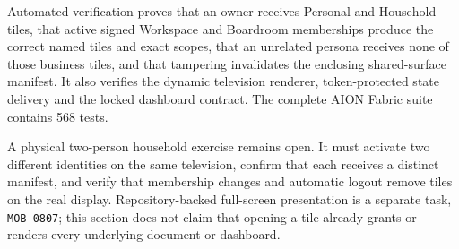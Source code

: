 Automated verification proves that an owner receives Personal and Household tiles,
that active signed Workspace and Boardroom memberships produce the correct named
tiles and exact scopes, that an unrelated persona receives none of those business
tiles, and that tampering invalidates the enclosing shared-surface manifest.  It
also verifies the dynamic television renderer, token-protected state delivery and
the locked dashboard contract.  The complete AION Fabric suite contains 568 tests.

A physical two-person household exercise remains open.  It must activate two
different identities on the same television, confirm that each receives a distinct
manifest, and verify that membership changes and automatic logout remove tiles on
the real display.  Repository-backed full-screen presentation is a separate task,
\texttt{MOB-0807}; this section does not claim that opening a tile already grants or
renders every underlying document or dashboard.
